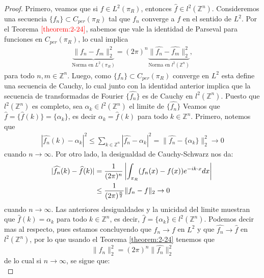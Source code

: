     \begin{proof}
      Primero, veamos que si $f\in L^2(\pi_R)$, entonces $\hat{f}\in l^2(\mathbb{Z}^{n})$. Consideremos una secuencia $\{f_n\}\subset C_{per}(\pi_R)$ tal que $f_n$ converge a $f$ en el sentido de $L^2$. Por el Teorema $\textcolor{red}{\ref{theorem:2-24}}$, sabemos que vale la identidad de Parseval para funciones en $C_{per}(\pi_R)$, lo cual implica
      \begin{align*}
        \underset{\text{Norma en $L^2(\pi_R)$}}{\underbrace{\|f_n-f_m\|_2^2}}=(2\pi)^n\underset{\text{Norma en $l^2(\mathbb{Z}^{n})$}}{\underbrace{\|\hat{f_n}-\hat{f_m}\|_2^2}},
      \end{align*}
      para todo $n,m\in\mathbb{Z}^{n}$. Luego, como $\{f_n\}\subset C_{per}(\pi_R)$ converge en $L^2$ esta define una secuencia de Cauchy, lo cual junto con la identidad anterior implica que la secuencia de transformadas de Fourier $\{\hat{f_n}\}$ es de Cauchy en $l^2(\mathbb{Z}^{n})$. Puesto que $l^2(\mathbb{Z}^{n})$  es completo, sea ${\alpha_k}\in l^2(\mathbb{Z}^{n})$ el limite de $\{\hat{f_n}\}$ Veamos que $\hat{f}=\{\hat{f}(k)\}=\{\alpha_k\}$, es decir $\alpha_k=\hat{f}(k)$ para todo $k\in\mathbb{Z}^{n}$. Primero, notemos que
      \begin{align*}
        |\hat{f_n}(k)-\alpha_k|^{2}\leq \sum_{k\in\mathbb{Z}^{n}}|\hat{f_n}-\alpha_k|^2=\|\hat{f_n}-\{\alpha_k\}\|_{2}^{2}\to 0  
      \end{align*}
      cuando $n\to\infty$. Por otro lado, la desigualdad de Cauchy-Schwarz nos da:
      \begin{align}
        |\hat{f_n}(k)-\hat{f}(k)|&=\frac{1}{(2\pi)^n}\left| \int_{\pi_R}(f_n(x)-f(x))e^{-ik\cdot x}dx \right|\notag{}\\
        &\leq \frac{1}{(2\pi)^{\frac{n}{2}}}\|f_n-f\|_2\to 0\label{eq:2-26}
      \end{align}
      cuando $n\to\infty$. Las anteriores desigualdades y la unicidad del limite muestran que $\hat{f}(k) = \alpha_k$ para todo $k \in \mathbb{Z}^{n}$, es decir, $\hat{f} = \{\alpha_k\}\in l^{2}(\mathbb{Z}^{n})$. Podemos decir mas al respecto, pues estamos concluyendo que $f_n\to f$ en $L^2$ y que $\hat{f_n}\to\hat{f}$ en $l^{2}(\mathbb{Z}^{n})$, por lo que usando el Teorema \textcolor{red}{\ref{theorem:2-24}} tenemos que
      \begin{equation}
        \|f_n\|_2^2=(2\pi)^{n}\|\hat{f_n}\|_{2}^{2}  
      \end{equation}
      de lo cual si $n\to\infty$, se sigue que:
      \begin{equation}

\end{equation}
\end{proof}
